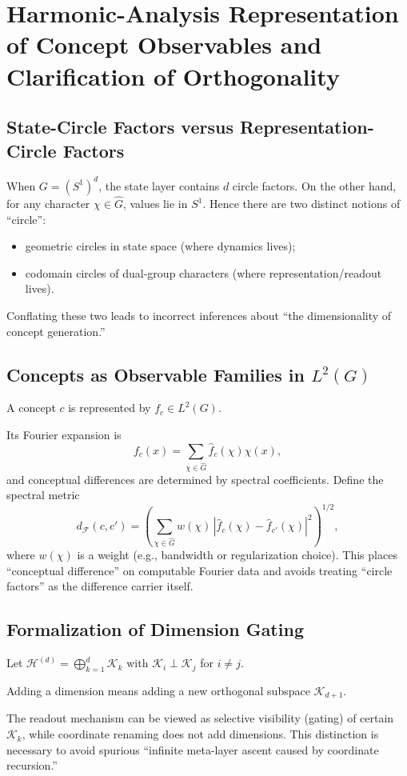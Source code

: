 ﻿\section{Harmonic-Analysis Representation of Concept Observables and Clarification of Orthogonality}

\subsection{State-Circle Factors versus Representation-Circle Factors}

When $G=(S^1)^d$, the state layer contains $d$ circle factors. On the other hand, for any character $\chi\in\widehat G$, values lie in $S^1$. Hence there are two distinct notions of ``circle'':
\begin{itemize}
  \item geometric circles in state space (where dynamics lives);
  \item codomain circles of dual-group characters (where representation/readout lives).
\end{itemize}
Conflating these two leads to incorrect inferences about ``the dimensionality of concept generation.''

\subsection{Concepts as Observable Families in \texorpdfstring{$L^2(G)$}{L2(G)}}

\begin{definition}
A concept $c$ is represented by $f_c\in L^2(G)$.
\end{definition}
Its Fourier expansion is
\[
f_c(x)=\sum_{\chi\in\widehat G}\widehat f_c(\chi)\chi(x),
\]
and conceptual differences are determined by spectral coefficients. Define the spectral metric
\[
d_{\mathcal{F}}(c,c')=\left(\sum_{\chi\in\widehat G} w(\chi)\,|\widehat f_c(\chi)-\widehat f_{c'}(\chi)|^2\right)^{1/2},
\]
where $w(\chi)$ is a weight (e.g., bandwidth or regularization choice). This places ``conceptual difference'' on computable Fourier data and avoids treating ``circle factors'' as the difference carrier itself.

\subsection{Formalization of Dimension Gating}

Let $\mathcal{H}^{(d)}=\bigoplus_{k=1}^d \mathcal{K}_k$ with $\mathcal{K}_i\perp\mathcal{K}_j$ for $i\neq j$.

\begin{definition}
Adding a dimension means adding a new orthogonal subspace $\mathcal{K}_{d+1}$.
\end{definition}
The readout mechanism can be viewed as selective visibility (gating) of certain $\mathcal{K}_k$, while coordinate renaming does not add dimensions. This distinction is necessary to avoid spurious ``infinite meta-layer ascent caused by coordinate recursion.''
